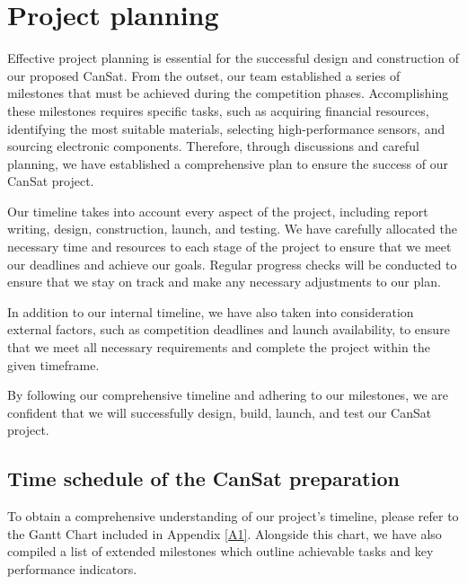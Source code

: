 \documentclass[11pt]{article}
\begin{document}
\section{Project planning}
Effective project planning is essential for the successful design and construction of our proposed CanSat. From the outset, our team established a series of milestones that must be achieved during the competition phases. Accomplishing these milestones requires specific tasks, such as acquiring financial resources, identifying the most suitable materials, selecting high-performance sensors, and sourcing electronic components. Therefore, through discussions and careful planning, we have established a comprehensive plan to ensure the success of our CanSat project.

Our timeline takes into account every aspect of the project, including report writing, design, construction, launch, and testing. We have carefully allocated the necessary time and resources to each stage of the project to ensure that we meet our deadlines and achieve our goals. Regular progress checks will be conducted to ensure that we stay on track and make any necessary adjustments to our plan.

In addition to our internal timeline, we have also taken into consideration external factors, such as competition deadlines and launch availability, to ensure that we meet all necessary requirements and complete the project within the given timeframe.

By following our comprehensive timeline and adhering to our milestones, we are confident that we will successfully design, build, launch, and test our CanSat project.

\subsection{Time schedule of the CanSat preparation}\label{time_schedule}
To obtain a comprehensive understanding of our project's timeline, please refer to the Gantt Chart included in Appendix \ref{A1}. Alongside this chart, we have also compiled a list of extended milestones which outline achievable tasks and key performance indicators. 
\end{document}
